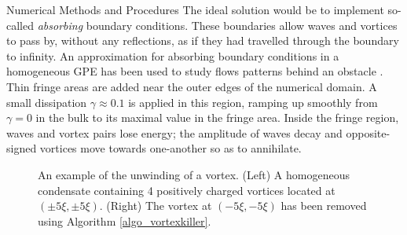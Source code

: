 \begin{chapter}{\label{cha:numerics}Numerical Methods and Procedures}
The ideal solution would be to implement so-called {\it absorbing} boundary conditions. These boundaries allow waves and vortices to pass by, without any reflections, as if they had travelled through the boundary to infinity. An approximation for absorbing boundary conditions in a homogeneous GPE has been used to study flows patterns behind an obstacle \cite{reeves_2015}. Thin fringe areas are added near the outer edges of the numerical domain. A small dissipation $\gamma \approx 0.1$ is applied in this region, ramping up smoothly from $\gamma=0$ in the bulk to its maximal value in the fringe area. Inside the fringe region, waves and vortex pairs lose energy; the amplitude of waves decay and opposite-signed vortices move towards one-another so as to annihilate.
\begin{figure}[!ht]
\begin{center}
\end{center}
  \caption{An example of the unwinding of a vortex. (Left) A homogeneous condensate containing 4 positively charged vortices located at $(\pm 5\xi,\pm 5\xi)$. (Right) The vortex at $(-5\xi,-5\xi)$ has been removed using Algorithm \ref{algo_vortexkiller}.}\label{fig:vortexunwind}
\end{figure}


\end{chapter}
